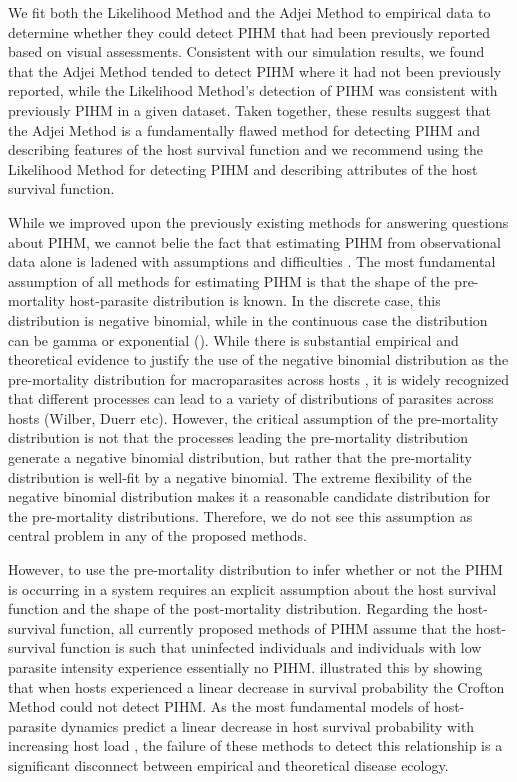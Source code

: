 \documentclass[12pt, a4paper]{article}
\begin{document}
We fit both the Likelihood Method and the Adjei Method to empirical data to
determine whether they could detect PIHM that had been previously reported
based on visual assessments.  Consistent with our simulation results, we found
that the Adjei Method tended to detect PIHM where it had not been previously
reported, while the Likelihood Method's detection of PIHM was consistent with
previously PIHM in a given dataset. Taken together, these results suggest that the Adjei Method is a fundamentally
flawed method for detecting PIHM and describing features of the host survival
function and we recommend using the Likelihood Method for detecting PIHM and describing attributes of the host survival function.


While we improved upon
the previously existing methods for answering questions about PIHM, we cannot belie the fact
that estimating PIHM from observational data alone is
ladened with assumptions and difficulties \citep{McCallum2000a}. The most fundamental
assumption of all methods for estimating PIHM is that the shape of the pre-
mortality host-parasite distribution is known. In the discrete case, this
distribution is negative binomial, while in the continuous case the distribution can be gamma or exponential (\citep{Ferguson2011}).  While there is substantial empirical and
theoretical evidence to justify the use of the negative binomial distribution
as the pre-mortality distribution for macroparasites across hosts \citep{Calabrese2011,Anderson1982a,Shaw1998}, it is widely recognized that different processes can lead to a variety of distributions of parasites across hosts (Wilber, Duerr etc).  However, the critical assumption of the pre-mortality distribution is not that the processes leading the pre-mortality distribution generate a negative binomial distribution, but rather that the pre-mortality distribution is well-fit by a negative binomial. The extreme flexibility of the negative binomial distribution makes it a reasonable candidate distribution for the pre-mortality distributions.  Therefore, we do not see this assumption as central problem in any of the proposed methods.

However, to use the pre-mortality distribution to infer whether or not the PIHM
is occurring in a system requires an explicit assumption about the host
survival function and the shape of the post-mortality distribution.  Regarding
the host-survival function, all currently proposed methods of PIHM assume that the host-survival
function is such that uninfected individuals and individuals with low parasite
intensity experience essentially no PIHM.  \cite{Lanciani1989} illustrated this
by showing that when hosts experienced a linear decrease in survival
probability the Crofton Method could not detect PIHM.  As the most fundamental models of host-parasite dynamics predict a linear decrease in host survival probability with increasing host load \citep{AndersonandMay1978}, the failure of these methods to detect this relationship is a significant disconnect between empirical and theoretical disease ecology.
\end{document}
